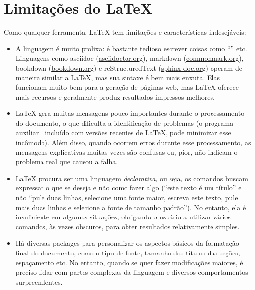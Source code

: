 \section{Limitações do \LaTeX{}}
\label{sec:limitations}

Como qualquer ferramenta, \LaTeX{} tem limitações e características
indesejáveis:

\begin{itemize}
    \item A linguagem é muito prolixa: é bastante tedioso escrever
    coisas como ``'' etc.
    Linguagens como asciidoc (\url{asciidoctor.org}), markdown
    (\url{commonmark.org}), bookdown (\url{bookdown.org}) e
    reStructuredText (\url{sphinx-doc.org}) operam de maneira similar
    a \LaTeX{}, mas sua sintaxe é bem mais enxuta. Elas funcionam
    muito bem para a geração de páginas web, mas \LaTeX{} oferece
    mais recursos e geralmente produz resultados impressos melhores.

    \item \LaTeX{} gera muitas mensagens pouco importantes durante
    o processamento do documento, o que dificulta a identificação
    de problemas (o programa auxiliar , incluído
    com versões recentes de \LaTeX{}, pode minimizar esse incômodo).
    Além disso, quando ocorrem erros durante esse processamento, as
    mensagens explicativas muitas vezes são confusas ou, pior, não
    indicam o problema real que causou a falha.

    \item \LaTeX{} procura ser uma linguagem \emph{declarativa}, ou seja,
    os comandos buscam expressar o que se deseja e não como fazer algo
    (``este texto é um título'' e não ``pule duas linhas, selecione uma
    fonte maior, escreva este texto, pule mais duas linhas e selecione a
    fonte de tamanho padrão''). No entanto, ela é insuficiente em algumas
    situações, obrigando o usuário a utilizar vários comandos, às vezes
    obscuros, para obter resultados relativamente simples.

    \item Há diversas packages para personalizar os aspectos básicos
    da formatação final do documento, como o tipo de fonte, tamanho dos
    títulos das seções, espaçamento etc. No entanto, quando se quer
    fazer modificações maiores, é preciso lidar com partes complexas da
    linguagem e diversos comportamentos surpreendentes.


\end{itemize}
